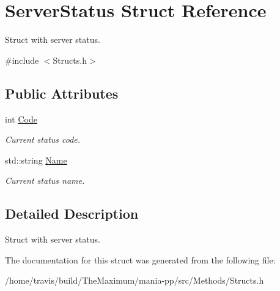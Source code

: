 \hypertarget{structServerStatus}{\section{Server\-Status Struct Reference}
\label{structServerStatus}
}


Struct with server status.  




{\ttfamily \#include $<$Structs.\-h$>$}

\subsection*{Public Attributes}
\begin{DoxyCompactItemize}
\item 
\hypertarget{structServerStatus_ad17b50be8d2cb9c1a62396885b1244cc}{int \hyperlink{structServerStatus_ad17b50be8d2cb9c1a62396885b1244cc}{Code}}\label{structServerStatus_ad17b50be8d2cb9c1a62396885b1244cc}

\begin{DoxyCompactList}\small\item\em Current status code. \end{DoxyCompactList}\item 
\hypertarget{structServerStatus_a6dd08d54208cd864fd1f384081209e0f}{std\-::string \hyperlink{structServerStatus_a6dd08d54208cd864fd1f384081209e0f}{Name}}\label{structServerStatus_a6dd08d54208cd864fd1f384081209e0f}

\begin{DoxyCompactList}\small\item\em Current status name. \end{DoxyCompactList}\end{DoxyCompactItemize}


\subsection{Detailed Description}
Struct with server status. 

The documentation for this struct was generated from the following file\-:\begin{DoxyCompactItemize}
\item 
/home/travis/build/\-The\-Maximum/mania-\/pp/src/\-Methods/Structs.\-h\end{DoxyCompactItemize}
